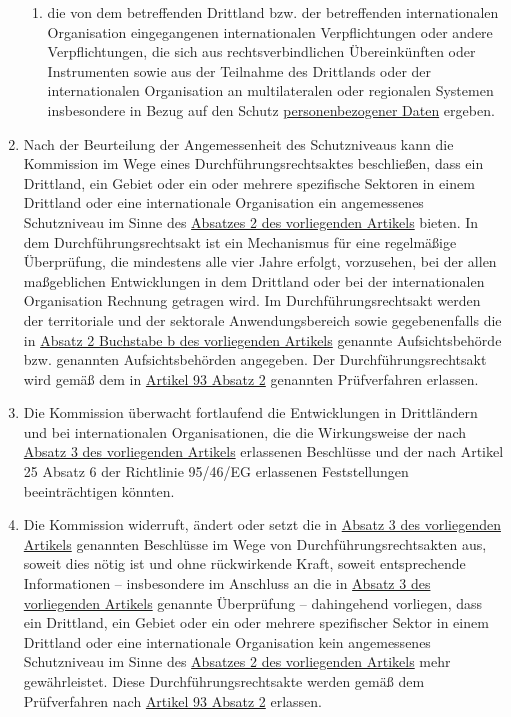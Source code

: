 \begin{enumerate}
\begin{enumerate}
    \item die von dem betreffenden Drittland bzw. der betreffenden internationalen Organisation eingegangenen
     internationalen Verpflichtungen oder andere Verpflichtungen, die sich aus rechtsverbindlichen Übereinkünften oder
     Instrumenten sowie aus der Teilnahme des Drittlands oder der internationalen Organisation an multilateralen oder
     regionalen Systemen insbesondere in Bezug auf den Schutz \hyperref[itm:04-1]{personenbezogener Daten} ergeben.
    \label{itm:45-2c}

  \end{enumerate}

  \item Nach der Beurteilung der Angemessenheit des Schutzniveaus kann die Kommission im Wege eines
   Durchführungsrechtsaktes beschließen, dass ein Drittland, ein Gebiet oder ein oder mehrere spezifische Sektoren in
   einem Drittland oder eine internationale Organisation ein angemessenes Schutzniveau im Sinne des \hyperref[itm:45-2]
   {Absatzes 2 des vorliegenden Artikels} bieten. In dem Durchführungsrechtsakt ist ein Mechanismus für eine
   regelmäßige Überprüfung, die mindestens alle vier Jahre erfolgt, vorzusehen, bei der allen maßgeblichen
   Entwicklungen in dem Drittland oder bei der internationalen Organisation Rechnung getragen wird. Im
   Durchführungsrechtsakt werden der territoriale und der sektorale Anwendungsbereich sowie gegebenenfalls die in
   \hyperref[itm:45-2b]{Absatz 2 Buchstabe b des vorliegenden Artikels} genannte Aufsichtsbehörde bzw. genannten
   Aufsichtsbehörden angegeben. Der Durchführungsrechtsakt wird gemäß dem in \hyperref[itm:93-2]{Artikel 93 Absatz 2}
   genannten Prüfverfahren erlassen.
  \label{itm:45-3}

  \item Die Kommission überwacht fortlaufend die Entwicklungen in Drittländern und bei internationalen Organisationen,
   die die Wirkungsweise der nach \hyperref[itm:45-3]{Absatz 3 des vorliegenden Artikels} erlassenen Beschlüsse und der
   nach Artikel 25 Absatz 6 der Richtlinie 95/46/EG erlassenen Feststellungen beeinträchtigen
   könnten.
  \label{itm:45-4}

  \item Die Kommission widerruft, ändert oder setzt die in \hyperref[itm:45-3]{Absatz 3 des vorliegenden Artikels}
   genannten Beschlüsse im Wege von Durchführungsrechtsakten aus, soweit dies nötig ist und ohne rückwirkende Kraft,
   soweit entsprechende Informationen -- insbesondere im Anschluss an die in \hyperref[itm:45-3]{Absatz 3 des
   vorliegenden Artikels} genannte Überprüfung -- dahingehend vorliegen, dass ein Drittland, ein Gebiet oder ein oder
   mehrere spezifischer Sektor in einem Drittland oder eine internationale Organisation kein angemessenes Schutzniveau
   im Sinne des \hyperref[itm:45-2]{Absatzes 2 des vorliegenden Artikels} mehr gewährleistet. Diese
   Durchführungsrechtsakte werden gemäß dem Prüfverfahren nach \hyperref[itm:93-2]{Artikel 93 Absatz 2} erlassen. 
  \label{itm:45-5}


\end{enumerate}
